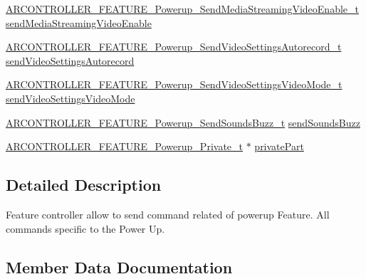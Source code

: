 \begin{DoxyCompactItemize}
\item 
\hyperlink{_a_r_c_o_n_t_r_o_l_l_e_r___feature_8h_a390cbab311ee5aafb81662caae98ebdc}{A\+R\+C\+O\+N\+T\+R\+O\+L\+L\+E\+R\+\_\+\+F\+E\+A\+T\+U\+R\+E\+\_\+\+Powerup\+\_\+\+Send\+Media\+Streaming\+Video\+Enable\+\_\+t} \hyperlink{struct_a_r_c_o_n_t_r_o_l_l_e_r___f_e_a_t_u_r_e___powerup__t_a3bc733bbc1c0f74299088479de1b68fd}{send\+Media\+Streaming\+Video\+Enable}
\item 
\hyperlink{_a_r_c_o_n_t_r_o_l_l_e_r___feature_8h_a9e4cf2ac58ab4007e91e0e028183eea0}{A\+R\+C\+O\+N\+T\+R\+O\+L\+L\+E\+R\+\_\+\+F\+E\+A\+T\+U\+R\+E\+\_\+\+Powerup\+\_\+\+Send\+Video\+Settings\+Autorecord\+\_\+t} \hyperlink{struct_a_r_c_o_n_t_r_o_l_l_e_r___f_e_a_t_u_r_e___powerup__t_a84b749fd0214f5ca7d8d5c299cffcaa0}{send\+Video\+Settings\+Autorecord}
\item 
\hyperlink{_a_r_c_o_n_t_r_o_l_l_e_r___feature_8h_adc58238a5bd778e9ee4648ad56a21a96}{A\+R\+C\+O\+N\+T\+R\+O\+L\+L\+E\+R\+\_\+\+F\+E\+A\+T\+U\+R\+E\+\_\+\+Powerup\+\_\+\+Send\+Video\+Settings\+Video\+Mode\+\_\+t} \hyperlink{struct_a_r_c_o_n_t_r_o_l_l_e_r___f_e_a_t_u_r_e___powerup__t_a93361b04c6ad070600f07828e1bb47d9}{send\+Video\+Settings\+Video\+Mode}
\item 
\hyperlink{_a_r_c_o_n_t_r_o_l_l_e_r___feature_8h_aa1c4384b71fd7028158525838150a6a1}{A\+R\+C\+O\+N\+T\+R\+O\+L\+L\+E\+R\+\_\+\+F\+E\+A\+T\+U\+R\+E\+\_\+\+Powerup\+\_\+\+Send\+Sounds\+Buzz\+\_\+t} \hyperlink{struct_a_r_c_o_n_t_r_o_l_l_e_r___f_e_a_t_u_r_e___powerup__t_a3e1be0f47163998fa0fdbc09902cc53e}{send\+Sounds\+Buzz}
\item 
\hyperlink{_a_r_c_o_n_t_r_o_l_l_e_r___feature_8h_ada0fd5558755026f6abd1f12f6d00fed}{A\+R\+C\+O\+N\+T\+R\+O\+L\+L\+E\+R\+\_\+\+F\+E\+A\+T\+U\+R\+E\+\_\+\+Powerup\+\_\+\+Private\+\_\+t} $\ast$ \hyperlink{struct_a_r_c_o_n_t_r_o_l_l_e_r___f_e_a_t_u_r_e___powerup__t_a45fd44d95c4539835d2b8d460d2ad0fa}{private\+Part}
\end{DoxyCompactItemize}


\subsection{Detailed Description}
Feature controller allow to send command related of powerup Feature. All commands specific to the Power Up. 

\subsection{Member Data Documentation}
